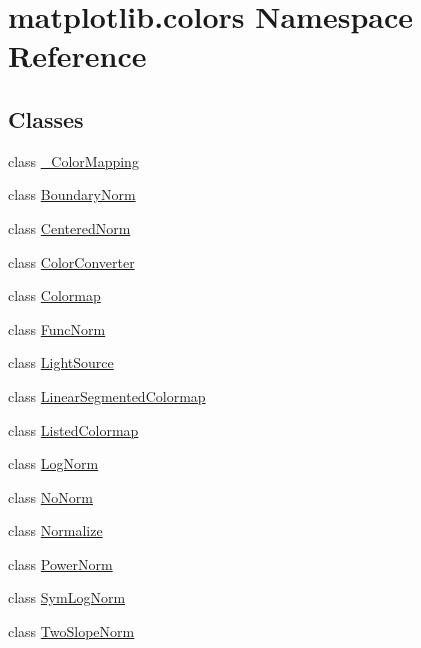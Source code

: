 \hypertarget{namespacematplotlib_1_1colors}{}\section{matplotlib.\+colors Namespace Reference}
\label{namespacematplotlib_1_1colors}
\subsection*{Classes}
\begin{DoxyCompactItemize}
\item 
class \hyperlink{classmatplotlib_1_1colors_1_1__ColorMapping}{\+\_\+\+Color\+Mapping}
\item 
class \hyperlink{classmatplotlib_1_1colors_1_1BoundaryNorm}{Boundary\+Norm}
\item 
class \hyperlink{classmatplotlib_1_1colors_1_1CenteredNorm}{Centered\+Norm}
\item 
class \hyperlink{classmatplotlib_1_1colors_1_1ColorConverter}{Color\+Converter}
\item 
class \hyperlink{classmatplotlib_1_1colors_1_1Colormap}{Colormap}
\item 
class \hyperlink{classmatplotlib_1_1colors_1_1FuncNorm}{Func\+Norm}
\item 
class \hyperlink{classmatplotlib_1_1colors_1_1LightSource}{Light\+Source}
\item 
class \hyperlink{classmatplotlib_1_1colors_1_1LinearSegmentedColormap}{Linear\+Segmented\+Colormap}
\item 
class \hyperlink{classmatplotlib_1_1colors_1_1ListedColormap}{Listed\+Colormap}
\item 
class \hyperlink{classmatplotlib_1_1colors_1_1LogNorm}{Log\+Norm}
\item 
class \hyperlink{classmatplotlib_1_1colors_1_1NoNorm}{No\+Norm}
\item 
class \hyperlink{classmatplotlib_1_1colors_1_1Normalize}{Normalize}
\item 
class \hyperlink{classmatplotlib_1_1colors_1_1PowerNorm}{Power\+Norm}
\item 
class \hyperlink{classmatplotlib_1_1colors_1_1SymLogNorm}{Sym\+Log\+Norm}
\item 
class \hyperlink{classmatplotlib_1_1colors_1_1TwoSlopeNorm}{Two\+Slope\+Norm}
\end{DoxyCompactItemize}
